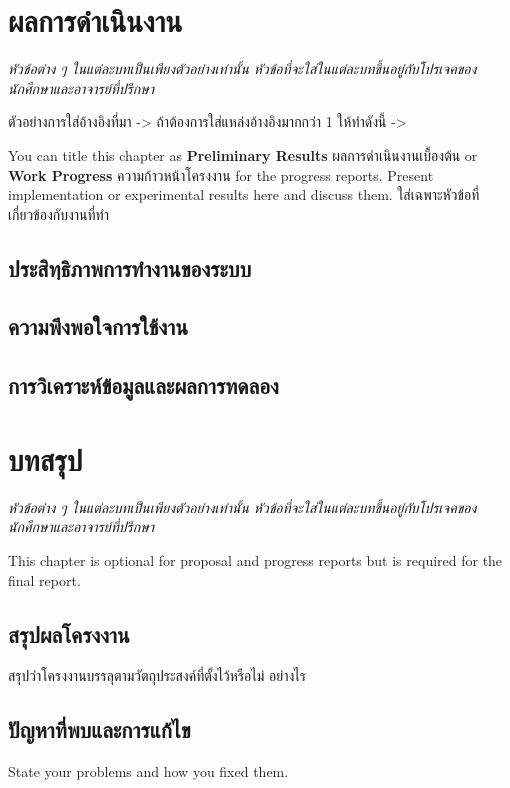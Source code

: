 \documentclass[12pt,oneside,openright,a4paper]{cpe-thai-project}
\begin{document}
\chapter{ผลการดำเนินงาน}


\emph{หัวข้อต่าง ๆ ในแต่ละบทเป็นเพียงตัวอย่างเท่านั้น หัวข้อที่จะใส่ในแต่ละบทขึ้นอยู่กับโปรเจคของนักศึกษาและอาจารย์ที่ปรึกษา}


ตัวอย่างการใส่อ้างอิงที่มา -> \cite{hypersense} ถ้าต้องการใส่แหล่งอ้างอิงมากกว่า 1 ให้ทำดังนี้ -> \cite{hypersense,bworld}

You can title this chapter as \textbf{Preliminary Results} ผลการดำเนินงานเบื้องต้น or \textbf{Work Progress} ความก้าวหน้าโครงงาน for the progress reports. Present implementation or experimental results here and discuss them.
ใส่เฉพาะหัวข้อที่เกี่ยวข้องกับงานที่ทำ

\section{ประสิทฺธิภาพการทำงานของระบบ}
\section{ความพึงพอใจการใช้งาน}
\section{การวิเคราะห์ข้อมูลและผลการทดลอง}

\chapter{บทสรุป}


\emph{หัวข้อต่าง ๆ ในแต่ละบทเป็นเพียงตัวอย่างเท่านั้น หัวข้อที่จะใส่ในแต่ละบทขึ้นอยู่กับโปรเจคของนักศึกษาและอาจารย์ที่ปรึกษา}



This chapter is optional for proposal and progress reports but
is required for the final report.

\section{สรุปผลโครงงาน}
สรุปว่าโครงงานบรรลุตามวัตถุประสงค์ที่ตั้งไว้หรือไม่ อย่างไร

\section{ปัญหาที่พบและการแก้ไข}
State your problems and how you fixed them.
\end{document}
